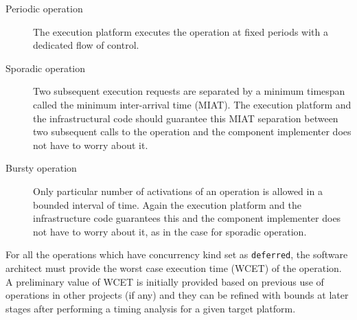 \begin{description}
\begin{description}
\item [Periodic operation] The execution platform executes the operation at fixed periods with a dedicated flow of control.
\item [Sporadic operation] Two subsequent execution requests are separated by a minimum timespan called the minimum inter-arrival time (MIAT). The execution platform and the infrastructural code should guarantee this MIAT separation between two subsequent calls to the operation and the component implementer does not have to worry about it.
\item [Bursty operation] Only particular number of activations of an operation is allowed in a bounded interval of time. Again the execution platform and the infrastructure code guarantees this and the component implementer does not have to worry about it, as in the case for sporadic operation.
\end{description}

For all the operations which have concurrency kind set as \texttt{deferred}, the software architect must provide the worst case execution time (WCET) of the operation. A preliminary value of WCET is initially provided based on previous use of operations in other projects (if any) and they can be refined with bounds at later stages after performing a timing analysis for a given target platform.


\end{description}
